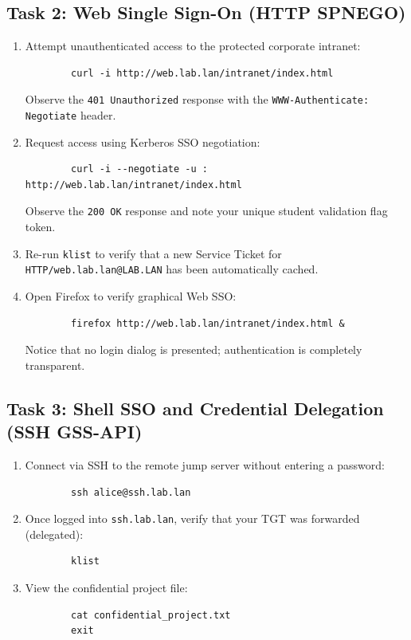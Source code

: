 \subsection{Task 2: Web Single Sign-On (HTTP SPNEGO)}
\begin{enumerate}
    \item Attempt unauthenticated access to the protected corporate intranet:
    \begin{verbatim}
        curl -i http://web.lab.lan/intranet/index.html
    \end{verbatim}
    Observe the {\tt 401 Unauthorized} response with the {\tt WWW-Authenticate: Negotiate} header.
    \item Request access using Kerberos SSO negotiation:
    \begin{verbatim}
        curl -i --negotiate -u : http://web.lab.lan/intranet/index.html
    \end{verbatim}
    Observe the {\tt 200 OK} response and note your unique student validation flag token.
    \item Re-run {\tt klist} to verify that a new Service Ticket for {\tt HTTP/web.lab.lan@LAB.LAN} has been automatically cached.
    \item Open Firefox to verify graphical Web SSO:
    \begin{verbatim}
        firefox http://web.lab.lan/intranet/index.html &
    \end{verbatim}
    Notice that no login dialog is presented; authentication is completely transparent.
\end{enumerate}

\subsection{Task 3: Shell SSO and Credential Delegation (SSH GSS-API)}
\begin{enumerate}
    \item Connect via SSH to the remote jump server without entering a password:
    \begin{verbatim}
        ssh alice@ssh.lab.lan
    \end{verbatim}
    \item Once logged into {\tt ssh.lab.lan}, verify that your TGT was forwarded (delegated):
    \begin{verbatim}
        klist
    \end{verbatim}
    \item View the confidential project file:
    \begin{verbatim}
        cat confidential_project.txt
        exit
    \end{verbatim}
\end{enumerate}

